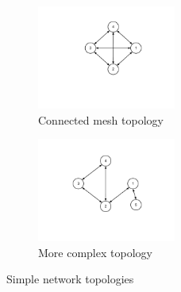\documentclass[12pt]{article}
\begin{document}
\begin{figure}[htp]
    \begin{subfigure}[b]{0.5\textwidth}
        \centering
        \includegraphics[clip,trim=45mm 45mm 45mm 20mm,width=0.5\textwidth]{images/con-mesh-topo.pdf}
        \caption{Connected mesh topology}
        \label{fig:con_mesh_topology}
    \end{subfigure}
    \begin{subfigure}[b]{0.5\textwidth}
        \centering
        \includegraphics[clip,trim=45mm 40mm 45mm 20mm,width=0.5\textwidth]{images/other-topo.pdf}
        \caption{More complex topology}
        \label{fig:other_topology}
    \end{subfigure}
    \caption{Simple network topologies}
\end{figure}

\end{document}
